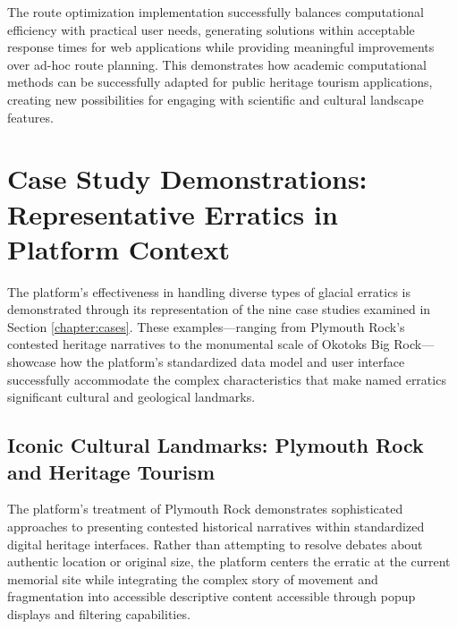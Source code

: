 The route optimization implementation successfully balances computational efficiency with practical user needs, generating solutions within acceptable response times for web applications while providing meaningful improvements over ad-hoc route planning. This demonstrates how academic computational methods can be successfully adapted for public heritage tourism applications, creating new possibilities for engaging with scientific and cultural landscape features.

\section{Case Study Demonstrations: Representative Erratics in Platform Context}
\label{sec:case_study_demonstrations}

The platform's effectiveness in handling diverse types of glacial erratics is demonstrated through its representation of the nine case studies examined in Section \ref{chapter:cases}. These examples—ranging from Plymouth Rock's contested heritage narratives to the monumental scale of Okotoks Big Rock—showcase how the platform's standardized data model and user interface successfully accommodate the complex characteristics that make named erratics significant cultural and geological landmarks.

\subsection{Iconic Cultural Landmarks: Plymouth Rock and Heritage Tourism}
\label{subsec:iconic_landmarks}

The platform's treatment of Plymouth Rock demonstrates sophisticated approaches to presenting contested historical narratives within standardized digital heritage interfaces. Rather than attempting to resolve debates about authentic location or original size, the platform centers the erratic at the current memorial site while integrating the complex story of movement and fragmentation into accessible descriptive content accessible through popup displays and filtering capabilities.


